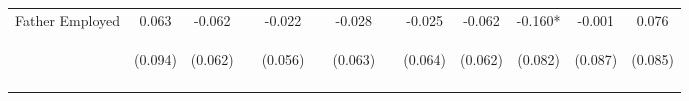\begin{tabular}{lcccccccccccc}
\noalign{\smallskip}Father Employed & 0.063 & -0.062 &  & -0.022 &  & -0.028 &  & -0.025 & -0.062 & -0.160* & -0.001 & 0.076\\
 & \begin{footnotesize}(0.094)\end{footnotesize} & \begin{footnotesize}(0.062)\end{footnotesize} & \begin{footnotesize}\end{footnotesize} & \begin{footnotesize}(0.056)\end{footnotesize} & \begin{footnotesize}\end{footnotesize} & \begin{footnotesize}(0.063)\end{footnotesize} & \begin{footnotesize}\end{footnotesize} & \begin{footnotesize}(0.064)\end{footnotesize} & \begin{footnotesize}(0.062)\end{footnotesize} & \begin{footnotesize}(0.082)\end{footnotesize} & \begin{footnotesize}(0.087)\end{footnotesize} & \begin{footnotesize}(0.085)\end{footnotesize}\\
\noalign{\smallskip}\hline\end{tabular}\\
